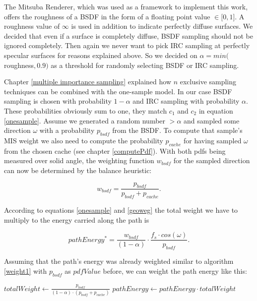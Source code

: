 The Mitsuba Renderer, which was used as a framework to implement this work, offers the roughness of a BSDF in the form of a floating point value $\in\lbrack 0,1\rbrack$. A roughness value of $\infty$ is used in addition to indicate perfectly diffuse surfaces.\newline
We decided that even if a surface is completely diffuse, BSDF sampling should not be ignored completely. Then again we never want to pick IRC sampling at perfectly specular surfaces for reasons explained above. So we decided on $\alpha = min($roughness$,0.9)$ as a threshold for randomly selecting BSDF or IRC sampling.

Chapter \ref{multiple importance sampling} explained how $n$ exclusive sampling techniques can be combined with the one-sample model. In our case BSDF sampling is chosen with probability $1 - \alpha$ and IRC sampling with probability $\alpha$. These probabilities obviously sum to one, they match $c_1$ and $c_2$ in equation \ref{onesample}.\newline
Assume we generated a random number $>\alpha$ and sampled some direction $\omega$ with a probability $p_{bsdf}$ from the BSDF. To compute that sample's MIS weight we also need to compute the probability $p_{cache}$ for having sampled $\omega$ from the chosen cache (see chapter \ref{computePdf}). With both pdfs being measured over solid angle, the weighting function $w_{bsdf}$ for the sampled direction can now be determined by the balance heuristic:

\begin{equation*}
w_{bsdf} = \frac{p_{bsdf}}{p_{bsdf}+p_{cache}}.
\end{equation*}

According to equations \ref{onesample} and \ref{geoweg} the total weight we have to multiply to the energy carried along the path is

\begin{equation*}
pathEnergy ^*= \frac{w_{bsdf}}{(1-\alpha)} \cdot \frac{f_s \cdot cos(\omega)}{p_{bsdf}}.
\end{equation*}

Assuming that the path's energy was already weighted similar to algorithm \ref{weight1} with $p_{bsdf}$ as $pdfValue$ before, we can weight the path energy like this: \newline

\begin{algorithmic}
\State $totalWeight \gets \frac{p_{bsdf}}{(1-\alpha) \cdot (p_{bsdf}+p_{cache})}$
\State $pathEnergy \gets pathEnergy \cdot totalWeight$
\end{algorithmic}


